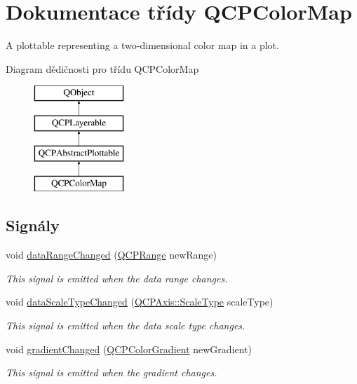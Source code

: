 \hypertarget{classQCPColorMap}{}\section{Dokumentace třídy Q\+C\+P\+Color\+Map}
\label{classQCPColorMap}


A plottable representing a two-\/dimensional color map in a plot.  


Diagram dědičnosti pro třídu Q\+C\+P\+Color\+Map\begin{figure}[H]
\begin{center}
\leavevmode
\includegraphics[height=4.000000cm]{classQCPColorMap}
\end{center}
\end{figure}
\subsection*{Signály}
\begin{DoxyCompactItemize}
\item 
void \hyperlink{classQCPColorMap_a482980f2335d09cfb36dd95ba9663197}{data\+Range\+Changed} (\hyperlink{classQCPRange}{Q\+C\+P\+Range} new\+Range)
\begin{DoxyCompactList}\small\item\em This signal is emitted when the data range changes. \end{DoxyCompactList}\item 
void \hyperlink{classQCPColorMap_a978d5d5c9f68cffef8c902b855c04490}{data\+Scale\+Type\+Changed} (\hyperlink{classQCPAxis_a36d8e8658dbaa179bf2aeb973db2d6f0}{Q\+C\+P\+Axis\+::\+Scale\+Type} scale\+Type)
\begin{DoxyCompactList}\small\item\em This signal is emitted when the data scale type changes. \end{DoxyCompactList}\item 
void \hyperlink{classQCPColorMap_abf4797f86e422ac6e0f732c4ff1a4d49}{gradient\+Changed} (\hyperlink{classQCPColorGradient}{Q\+C\+P\+Color\+Gradient} new\+Gradient)
\begin{DoxyCompactList}\small\item\em This signal is emitted when the gradient changes. \end{DoxyCompactList}\end{DoxyCompactItemize}
